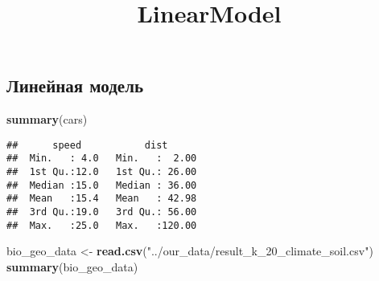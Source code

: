 \documentclass[]{article}
\title{LinearModel}
\author{}
\date{}
\newenvironment{Shaded}{\begin{snugshade}}{\end{snugshade}}
\newcommand{\KeywordTok}[1]{\textcolor[rgb]{0.13,0.29,0.53}{\textbf{{#1}}}}
\newcommand{\StringTok}[1]{\textcolor[rgb]{0.31,0.60,0.02}{{#1}}}
\newcommand{\NormalTok}[1]{{#1}}
\begin{document}
\maketitle

\subsection{Линейная модель}\label{-}

\begin{Shaded}
\begin{Highlighting}[]
\KeywordTok{summary}\NormalTok{(cars)}
\end{Highlighting}
\end{Shaded}

\begin{verbatim}
##      speed           dist       
##  Min.   : 4.0   Min.   :  2.00  
##  1st Qu.:12.0   1st Qu.: 26.00  
##  Median :15.0   Median : 36.00  
##  Mean   :15.4   Mean   : 42.98  
##  3rd Qu.:19.0   3rd Qu.: 56.00  
##  Max.   :25.0   Max.   :120.00
\end{verbatim}

\begin{Shaded}
\begin{Highlighting}[]
\NormalTok{bio_geo_data <-}\StringTok{ }\KeywordTok{read.csv}\NormalTok{(}\StringTok{"../our_data/result_k_20_climate_soil.csv"}\NormalTok{)}
\KeywordTok{summary}\NormalTok{(bio_geo_data)}
\end{Highlighting}
\end{Shaded}
\end{document}
